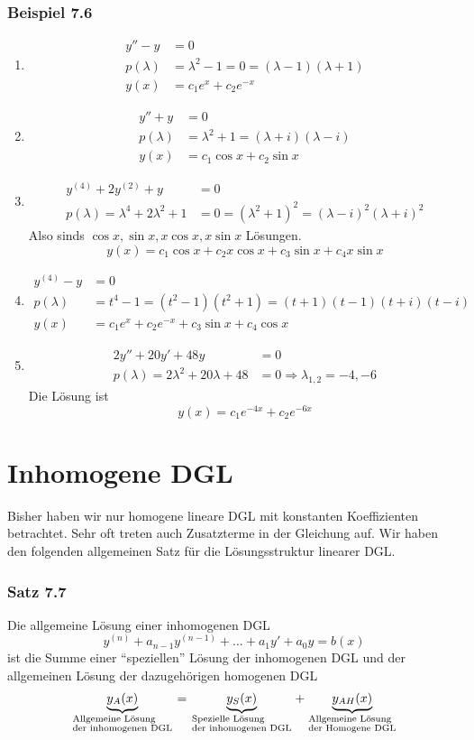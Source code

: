 \subsubsection*{Beispiel 7.6}
\begin{enumerate}
\item \begin{align*}
y''-y&=0\\
p(\lambda)&=\lambda^2-1=0=(\lambda-1)(\lambda+1)\\
y(x)&=c_1e^x+c_2e^{-x}
\end{align*}
\item 
\begin{align*}
y''+y&=0\\
p(\lambda)&=\lambda^2+1=(\lambda+i)(\lambda-i)\\
y(x)&=c_1\cos x+c_2\sin x
\end{align*}
\item 
\begin{align*}
y^{(4)}+2y^{(2)}+y&=0\\
p(\lambda)=\lambda^4+2\lambda^2+1&=0=(\lambda^2+1)^2=(\lambda-i)^2(\lambda+i)^2
\end{align*}
Also sinds $\cos x, \sin x, x\cos x,x\sin x$ Lösungen. \[y(x)=c_1\cos x+c_2 x\cos x+c_3\sin x+c_4 x\sin x\]
\item \begin{align*}
y^{(4)}-y&=0\\
p(\lambda)&=t^4-1=(t^2-1)(t^2+1)=(t+1)(t-1)(t+i)(t-i)\\
y(x)&=c_1e^x+c_2e^{-x}+c_3\sin x+c_4\cos x
\end{align*}
\item \begin{align*}
2y''+20y'+48y&=0\\
p(\lambda)=2\lambda^2 +20\lambda+48&=0\Rightarrow \lambda_{1,2}=-4,-6
\end{align*}
Die Lösung ist \[y(x)=c_1e^{-4x}+c_2e^{-6x}\]
\end{enumerate}
\section{Inhomogene DGL}
Bisher haben wir nur homogene lineare DGL mit konstanten Koeffizienten betrachtet. Sehr oft treten auch Zusatzterme in der Gleichung auf. Wir haben den folgenden allgemeinen Satz für die Lösungsstruktur linearer DGL.
\subsubsection*{Satz 7.7}
Die allgemeine Lösung einer inhomogenen DGL \[y^{(n)}+a_{n-1}y^{(n-1)}+\dots +a_1y'+a_0y=b(x)\] ist die Summe einer ``speziellen'' Lösung der inhomogenen DGL und der allgemeinen Lösung der dazugehörigen homogenen DGL $$\underbrace {{y_A}(x)}_{\scriptstyle{\text{Allgemeine Lösung }}\hfill\atop
\scriptstyle{\text{der inhomogenen DGL}}\hfill} = \underbrace {{y_S}(x)}_{\scriptstyle{\text{Spezielle Lösung }}\hfill\atop
\scriptstyle{\text{der inhomogenen DGL}}\hfill} + \underbrace {{y_{AH}}(x)}_{\scriptstyle{\text{Allgemeine Lösung }}\hfill\atop
\scriptstyle{\text{der Homogene DGL}}\hfill}$$
